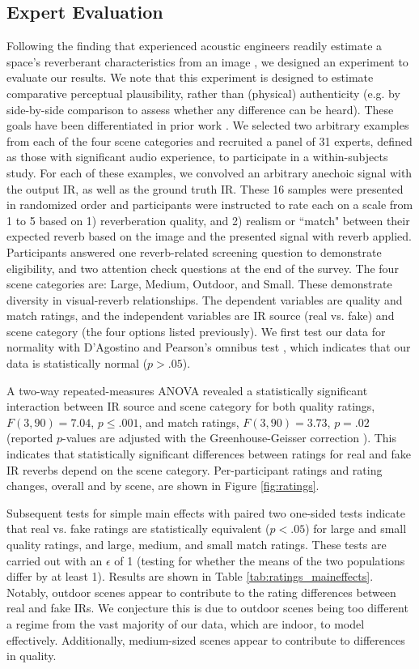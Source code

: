 \documentclass[10pt,twocolumn,letterpaper]{article}
\begin{document}
\subsection{Expert Evaluation}
Following the finding that experienced acoustic engineers readily estimate a space's reverberant characteristics from an image \cite{Kon2018}, we designed an experiment to evaluate our results. We note that this experiment is designed to estimate comparative perceptual plausibility, rather than (physical) authenticity (e.g. by side-by-side comparison to assess whether any difference can be heard). These goals have been differentiated in prior work \cite{pellegrini2001quality}. We selected two arbitrary examples from each of the four scene categories and recruited a panel of 31 experts, defined as those with significant audio experience, to participate in a within-subjects study. For each of these examples, we convolved an arbitrary anechoic signal with the output IR, as well as the ground truth IR. These 16 samples were presented in randomized order and participants were instructed to rate each on a scale from 1 to 5 based on 1) reverberation quality, and 2) realism or ``match" between their expected reverb based on the image and the presented signal with reverb applied. Participants answered one reverb-related screening question to demonstrate eligibility, and two attention check questions at the end of the survey. The four scene categories are: Large, Medium, Outdoor, and Small. These demonstrate diversity in visual-reverb relationships. The dependent variables are quality and match ratings, and the independent variables are IR source (real vs. fake) and scene category (the four options listed previously). We first test our data for normality with D'Agostino and Pearson's omnibus test \cite{pearson1977tests}, which indicates that our data is statistically normal ($p>.05$).

A two-way repeated-measures ANOVA revealed a statistically significant interaction between IR source and scene category for both quality ratings, $F(3, 90)=7.04$, $p\leq .001$, and match ratings, $F(3, 90)=3.73$, $p=.02$ (reported $p$-values are adjusted with the Greenhouse-Geisser correction \cite{greenhouse1959methods}). This indicates that statistically significant differences between ratings for real and fake IR reverbs depend on the scene category. Per-participant ratings and rating changes, overall and by scene, are shown in Figure \ref{fig:ratings}.

Subsequent tests for simple main effects with paired two one-sided tests indicate that real vs. fake ratings are statistically equivalent ($p<.05$) for large and small quality ratings, and large, medium, and small match ratings. These tests are carried out with an $\epsilon$ of 1 (testing for whether the means of the two populations differ by at least 1). Results are shown in Table \ref{tab:ratings_maineffects}. Notably, outdoor scenes appear to contribute to the rating differences between real and fake IRs. We conjecture this is due to outdoor scenes being too different a regime from the vast majority of our data, which are indoor, to model effectively. Additionally, medium-sized scenes appear to contribute to differences in quality.
\end{document}
